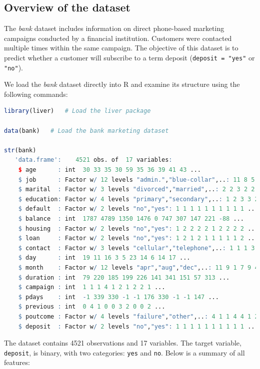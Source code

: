 \documentclass[
]{book}
\newcommand{\passthrough}[1]{#1}
\theoremstyle{definition}
\theoremstyle{definition}
\theoremstyle{definition}
\theoremstyle{definition}
\theoremstyle{remark}
\begin{document}
\subsection*{Overview of the dataset}\label{overview-of-the-dataset-2}

The \emph{bank} dataset includes information on direct phone-based marketing campaigns conducted by a financial institution. Customers were contacted multiple times within the same campaign. The objective of this dataset is to predict whether a customer will subscribe to a term deposit (\passthrough{\lstinline!deposit = "yes"!} or \passthrough{\lstinline!"no"!}).

We load the \emph{bank} dataset directly into R and examine its structure using the following commands:

\begin{lstlisting}[language=R]
library(liver)   # Load the liver package

data(bank)   # Load the bank marketing dataset 

str(bank)
   'data.frame':    4521 obs. of  17 variables:
    $ age      : int  30 33 35 30 59 35 36 39 41 43 ...
    $ job      : Factor w/ 12 levels "admin.","blue-collar",..: 11 8 5 5 2 5 7 10 3 8 ...
    $ marital  : Factor w/ 3 levels "divorced","married",..: 2 2 3 2 2 3 2 2 2 2 ...
    $ education: Factor w/ 4 levels "primary","secondary",..: 1 2 3 3 2 3 3 2 3 1 ...
    $ default  : Factor w/ 2 levels "no","yes": 1 1 1 1 1 1 1 1 1 1 ...
    $ balance  : int  1787 4789 1350 1476 0 747 307 147 221 -88 ...
    $ housing  : Factor w/ 2 levels "no","yes": 1 2 2 2 2 1 2 2 2 2 ...
    $ loan     : Factor w/ 2 levels "no","yes": 1 2 1 2 1 1 1 1 1 2 ...
    $ contact  : Factor w/ 3 levels "cellular","telephone",..: 1 1 1 3 3 1 1 1 3 1 ...
    $ day      : int  19 11 16 3 5 23 14 6 14 17 ...
    $ month    : Factor w/ 12 levels "apr","aug","dec",..: 11 9 1 7 9 4 9 9 9 1 ...
    $ duration : int  79 220 185 199 226 141 341 151 57 313 ...
    $ campaign : int  1 1 1 4 1 2 1 2 2 1 ...
    $ pdays    : int  -1 339 330 -1 -1 176 330 -1 -1 147 ...
    $ previous : int  0 4 1 0 0 3 2 0 0 2 ...
    $ poutcome : Factor w/ 4 levels "failure","other",..: 4 1 1 4 4 1 2 4 4 1 ...
    $ deposit  : Factor w/ 2 levels "no","yes": 1 1 1 1 1 1 1 1 1 1 ...
\end{lstlisting}

The dataset contains 4521 observations and 17 variables. The target variable, \passthrough{\lstinline!deposit!}, is binary, with two categories: \passthrough{\lstinline!yes!} and \passthrough{\lstinline!no!}. Below is a summary of all features:
\end{document}
